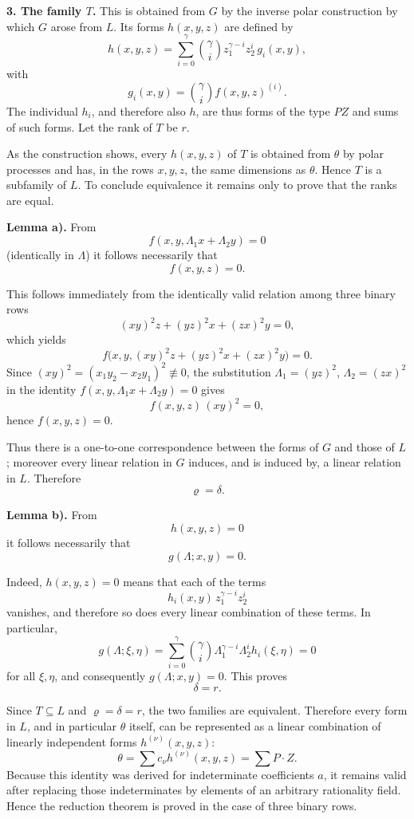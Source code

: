 \documentclass[11pt]{article}
\begin{document}
\medskip
\noindent\textbf{3. The family \(T\).}
This is obtained from \(G\) by the inverse polar construction by which \(G\) arose from \(L\). Its forms \(h(x,y,z)\) are defined by
\[
h(x,y,z)=\sum_{i=0}^{\gamma}\binom{\gamma}{i}z_1^{\gamma-i}z_2^i\, g_i(x,y),
\]
with
\[
g_i(x,y)=\binom{\gamma}{i}f(x,y,z)^{(i)}.
\]
The individual \(h_i\), and therefore also \(h\), are thus forms of the type \(PZ\) and sums of such forms. Let the rank of \(T\) be \(r\).

As the construction shows, every \(h(x,y,z)\) of \(T\) is obtained from \(\theta\) by polar processes and has, in the rows \(x,y,z\), the same dimensions as \(\theta\). Hence \(T\) is a subfamily of \(L\). To conclude equivalence it remains only to prove that the ranks are equal.

\medskip
\noindent\textbf{Lemma a).}
From
\[
f(x,y,\Lambda_1x+\Lambda_2y)=0
\]
(identically in \(\Lambda\)) it follows necessarily that
\[
f(x,y,z)=0.
\]

This follows immediately from the identically valid relation among three binary rows
\[
(xy)^2 z+(yz)^2 x+(zx)^2 y=0,
\]
which yields
\[
f\bigl(x,y,(xy)^2z+(yz)^2x+(zx)^2y\bigr)=0.
\]
Since \((xy)^2=(x_1y_2-x_2y_1)^2\not\equiv 0\), the substitution \(\Lambda_1=(yz)^2\), \(\Lambda_2=(zx)^2\) in the identity \(f(x,y,\Lambda_1x+\Lambda_2y)=0\) gives
\[
f(x,y,z)\,(xy)^2=0,
\]
hence \(f(x,y,z)=0\).

Thus there is a one-to-one correspondence between the forms of \(G\) and those of \(L\); moreover every linear relation in \(G\) induces, and is induced by, a linear relation in \(L\). Therefore
\[
\varrho=\delta.
\]

\medskip
\noindent\textbf{Lemma b).}
From
\[
h(x,y,z)=0
\]
it follows necessarily that
\[
g(\Lambda;x,y)=0.
\]

Indeed, \(h(x,y,z)=0\) means that each of the terms
\[
h_i(x,y)\,z_1^{\gamma-i}z_2^i
\]
vanishes, and therefore so does every linear combination of these terms. In particular,
\[
g(\Lambda;\xi,\eta)=\sum_{i=0}^{\gamma}\binom{\gamma}{i}\Lambda_1^{\gamma-i}\Lambda_2^i h_i(\xi,\eta)=0
\]
for all \(\xi,\eta\), and consequently \(g(\Lambda;x,y)=0\). This proves
\[
\delta=r.
\]

Since \(T\subseteq L\) and \(\varrho=\delta=r\), the two families are equivalent. Therefore every form in \(L\), and in particular \(\theta\) itself, can be represented as a linear combination of linearly independent forms \(h^{(\nu)}(x,y,z)\):
\[
\theta=\sum c_\nu h^{(\nu)}(x,y,z)=\sum P\cdot Z.
\]
Because this identity was derived for indeterminate coefficients \(a\), it remains valid after replacing those indeterminates by elements of an arbitrary rationality field. Hence the reduction theorem is proved in the case of three binary rows.
\end{document}
